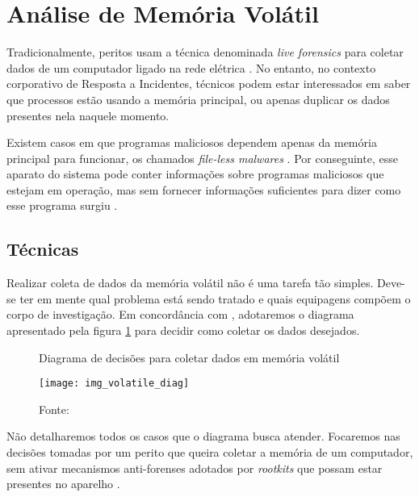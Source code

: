 \section{Análise de Memória Volátil}
    
    \vspace{10.5cm}
    
    \hspace{1cm}
    Tradicionalmente, peritos usam a técnica denominada \textit{live forensics} para coletar dados de um computador ligado na rede elétrica \cite{vecchia2019}. No entanto, no contexto corporativo de Resposta a Incidentes, técnicos podem estar interessados em saber que processos estão usando a memória principal, ou apenas duplicar os dados presentes nela naquele momento.
    
    \vspace{4mm}
    
    \hspace{1cm}
    Existem casos em que programas maliciosos dependem apenas da memória principal para funcionar, os chamados \textit{file-less malwares} \cite{wael2018}. Por conseguinte, esse aparato do sistema pode conter informações sobre programas maliciosos que estejam em operação, mas sem fornecer informações suficientes para dizer como esse programa surgiu \cite{luttgens2014}.

    \subsection{Técnicas}
    
    \hspace{1cm}
    Realizar coleta de dados da memória volátil não é uma tarefa tão simples. Deve-se ter em mente qual problema está sendo tratado e quais equipagens compõem o corpo de investigação. Em concordância com , adotaremos o diagrama apresentado pela figura \ref{diagrama_volatile} para decidir como coletar os dados desejados.
    
    \begin{figure}[H]
    	\centering
    	\caption{Diagrama de decisões para coletar dados em memória volátil}
    	\texttt{[image: img\_volatile\_diag]}
    	\caption*{Fonte: }
    	\label{diagrama_volatile}
    \end{figure}
    
    \hspace{1cm}
    Não detalharemos todos os casos que o diagrama busca atender. Focaremos nas decisões tomadas por um perito que queira coletar a memória de um computador, sem ativar mecanismos anti-forenses adotados por \textit{rootkits} que possam estar presentes no aparelho \cite{ligh2014}.
    
